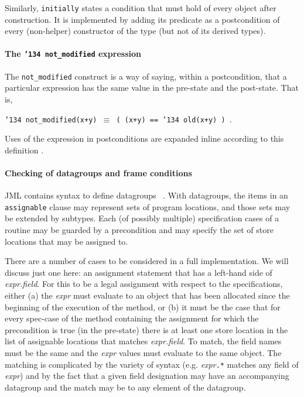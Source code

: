 \documentclass{sig-alternate}
\begin{document}
Similarly, \texttt{initially} states a condition that must hold of every object after construction.  It is implemented by adding its predicate as a postcondition of every (non-helper) constructor of the type (but not 
of its derived types).

\paragraph*{The \texttt{\char'134 not\_modified} expression}
The \texttt{not\_modified} construct is a way of saying, within a postcondition, that a particular 
expression has the same value in the pre-state and the post-state.  That is,
\begin{center}
\texttt{\char'134 not\_modified(x+y) $\equiv$ ( (x+y) == \char'134 old(x+y) )  }.
\end{center}
Uses of the expression in postconditions are expanded inline according to this definition .

\paragraph*{Checking of datagroups and frame conditions}
JML contains syntax to define datagroups ~\cite{Leino-Poetzsch-Heffter-Zhou02}.  With datagroups,
the items in an \texttt{assignable} clause may represent sets of program locations,
and those sets may be extended by subtypes.
 Each (of possibly multiple) specification cases of a routine may be guarded by a precondition and may specify the
set of store locations that may be assigned to. 

There are a number of cases to be considered in a full implementation.  We will discuss
just one here: an assignment statement that has a left-hand side of \textit{expr.field}.
For this to be a legal assignment with respect to the specifications, either (a) the 
\textit{expr} must evaluate to an object that has been allocated since the beginning of
the execution of the method, or (b) it must be the
case that for every spec-case of the method containing the assignment
for which the precondition is true (in the pre-state) there is at least one store location
in the list of assignable locations that matches \textit{expr.field}.  To match, the
field names must be the same and the \textit{expr} values must evaluate to the same
object.  The matching is complicated by the variety of syntax (e.g. \textit{expr}\texttt{.*}
matches any field of \textit{expr}) and by the fact that a given field designation may
have an accompanying datagroup and the match may be to any element of the datagroup.
\end{document}
